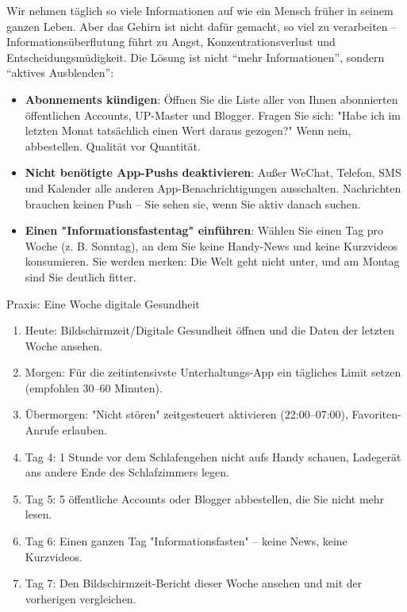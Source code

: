
Wir nehmen täglich so viele Informationen auf wie ein Mensch früher in seinem ganzen Leben. Aber das Gehirn ist nicht dafür gemacht, so viel zu verarbeiten – Informationsüberflutung führt zu Angst, Konzentrationsverlust und Entscheidungsmüdigkeit. Die Lösung ist nicht “mehr Informationen”, sondern “aktives Ausblenden”:

\begin{itemize}
  \item \textbf{Abonnements kündigen}: Öffnen Sie die Liste aller von Ihnen abonnierten öffentlichen Accounts, UP-Master und Blogger. Fragen Sie sich: "Habe ich im letzten Monat tatsächlich einen Wert daraus gezogen?" Wenn nein, abbestellen. Qualität vor Quantität.
  \item \textbf{Nicht benötigte App-Pushs deaktivieren}: Außer WeChat, Telefon, SMS und Kalender alle anderen App-Benachrichtigungen ausschalten. Nachrichten brauchen keinen Push – Sie sehen sie, wenn Sie aktiv danach suchen.
  \item \textbf{Einen "Informationsfastentag" einführen}: Wählen Sie einen Tag pro Woche (z. B. Sonntag), an dem Sie keine Handy-News und keine Kurzvideos konsumieren. Sie werden merken: Die Welt geht nicht unter, und am Montag sind Sie deutlich fitter.
\end{itemize}

\begin{tcbpractice}{Praxis: Eine Woche digitale Gesundheit}
\begin{enumerate}
  \item Heute: Bildschirmzeit/Digitale Gesundheit öffnen und die Daten der letzten Woche ansehen.
  \item Morgen: Für die zeitintensivste Unterhaltungs-App ein tägliches Limit setzen (empfohlen 30–60 Minuten).
  \item Übermorgen: "Nicht stören" zeitgesteuert aktivieren (22:00–07:00), Favoriten-Anrufe erlauben.
  \item Tag 4: 1 Stunde vor dem Schlafengehen nicht aufs Handy schauen, Ladegerät ans andere Ende des Schlafzimmers legen.
  \item Tag 5: 5 öffentliche Accounts oder Blogger abbestellen, die Sie nicht mehr lesen.
  \item Tag 6: Einen ganzen Tag "Informationsfasten" – keine News, keine Kurzvideos.
  \item Tag 7: Den Bildschirmzeit-Bericht dieser Woche ansehen und mit der vorherigen vergleichen.
\end{enumerate}

\end{tcbpractice}

